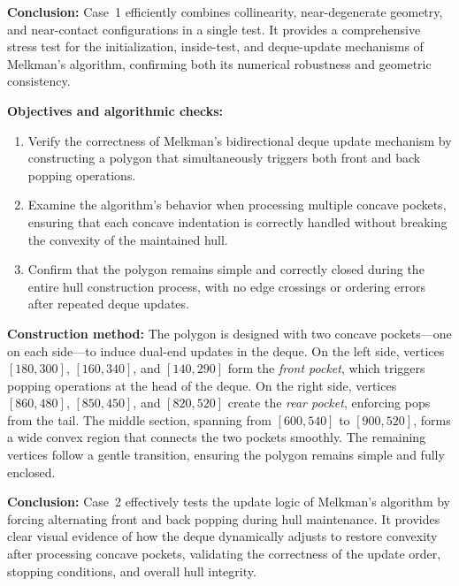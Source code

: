 \documentclass{article}
\begin{document}
\textbf{Conclusion:}
Case~1 efficiently combines collinearity, near-degenerate geometry, and near-contact configurations in a single test. 
It provides a comprehensive stress test for the initialization, inside-test, and deque-update mechanisms of Melkman’s algorithm, confirming both its numerical robustness and geometric consistency.


\textbf{Objectives and algorithmic checks:}\

\begin{enumerate}
    \item Verify the correctness of Melkman’s bidirectional deque update mechanism by constructing a polygon that simultaneously triggers both front and back popping operations.
    \item Examine the algorithm’s behavior when processing multiple concave pockets, ensuring that each concave indentation is correctly handled without breaking the convexity of the maintained hull.
    \item Confirm that the polygon remains simple and correctly closed during the entire hull construction process, with no edge crossings or ordering errors after repeated deque updates.
\end{enumerate}

\textbf{Construction method:}
The polygon is designed with two concave pockets—one on each side—to induce dual-end updates in the deque. On the left side, vertices $[180,300]$, $[160,340]$, and $[140,290]$ form the \emph{front pocket}, which triggers popping operations at the head of the deque. On the right side, vertices $[860,480]$, $[850,450]$, and $[820,520]$ create the \emph{rear pocket}, enforcing pops from the tail. The middle section, spanning from $[600,540]$ to $[900,520]$, forms a wide convex region that connects the two pockets smoothly. The remaining vertices follow a gentle transition, ensuring the polygon remains simple and fully enclosed.

\textbf{Conclusion:}
Case~2 effectively tests the update logic of Melkman’s algorithm by forcing alternating front and back popping during hull maintenance. 
It provides clear visual evidence of how the deque dynamically adjusts to restore convexity after processing concave pockets, validating the correctness of the update order, stopping conditions, and overall hull integrity.

\end{document}
